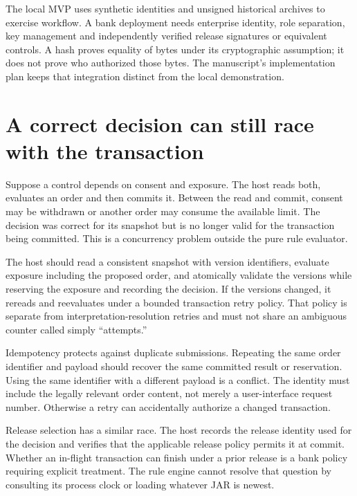\documentclass[12pt,a4paper,oneside,openany]{book}
\begin{document}
The local MVP uses synthetic identities and unsigned historical archives to
exercise workflow. A bank deployment needs enterprise identity, role separation,
key management and independently verified release signatures or equivalent
controls. A hash proves equality of bytes under its cryptographic assumption;
it does not prove who authorized those bytes. The manuscript's implementation
plan keeps that integration distinct from the local demonstration.

\section{A correct decision can still race with the transaction}
\label{merge:M07:13}


Suppose a control depends on consent and exposure. The host reads both, evaluates
an order and then commits it. Between the read and commit, consent may be
withdrawn or another order may consume the available limit. The decision was
correct for its snapshot but is no longer valid for the transaction being
committed. This is a concurrency problem outside the pure rule evaluator.

The host should read a consistent snapshot with version identifiers, evaluate
exposure including the proposed order, and atomically validate the versions while
reserving the exposure and recording the decision. If the versions changed, it
rereads and reevaluates under a bounded transaction retry policy. That policy is
separate from interpretation-resolution retries and must not share an ambiguous
counter called simply ``attempts.''

Idempotency protects against duplicate submissions. Repeating the same order
identifier and payload should recover the same committed result or reservation.
Using the same identifier with a different payload is a conflict. The identity
must include the legally relevant order content, not merely a user-interface
request number. Otherwise a retry can accidentally authorize a changed transaction.

Release selection has a similar race. The host records the release identity used
for the decision and verifies that the applicable release policy permits it at
commit. Whether an in-flight transaction can finish under a prior release is a
bank policy requiring explicit treatment. The rule engine cannot resolve that
question by consulting its process clock or loading whatever JAR is newest.
\end{document}
